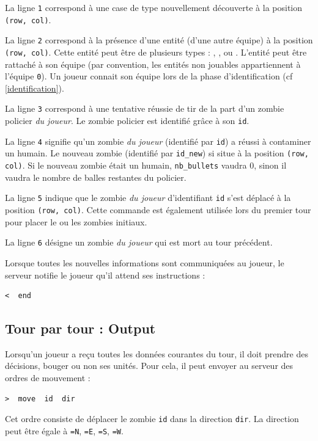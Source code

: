 La ligne \lstinline!1! correspond à une case de type \water{} nouvellement découverte à la position \lstinline!(row, col)!.

La ligne \lstinline!2! correspond à la présence d'une entité (d'une autre équipe) à la position \lstinline!(row, col)!.
Cette entité peut être de plusieurs types : \human{}, \cop{}, \zombie{} ou \berzerk{}.
L'entité peut être rattaché à son équipe (par convention, les entités non jouables appartiennent à l'équipe \lstinline!0!).
Un joueur connait son équipe lors de la phase d'identification (cf \ref{identification}).

La ligne \lstinline!3! correspond à une tentative réussie de tir de la part d'un zombie policier \emph{du joueur}.
Le zombie policier est identifié grâce à son \lstinline!id!.

La ligne \lstinline!4! signifie qu'un zombie \emph{du joueur} (identifié par \lstinline!id!) a réussi à contaminer un humain.
Le nouveau zombie (identifié par \lstinline!id_new!) si situe à la position \lstinline!(row, col)!.
Si le nouveau zombie était un humain, \lstinline!nb_bullets! vaudra 0, sinon il vaudra le nombre de balles restantes du policier.

La ligne \lstinline!5! indique que le zombie \emph{du joueur} d'identifiant \lstinline!id! s'est déplacé à la position \lstinline!(row, col)!.
Cette commande est également utilisée lors du premier tour pour placer le ou les zombies initiaux.

La ligne \lstinline!6! désigne un zombie \emph{du joueur} qui est mort au tour précédent.

Lorsque toutes les nouvelles informations sont communiquées au joueur, le serveur notifie le joueur qu'il attend ses instructions :
\begin{lstlisting}
<  end
\end{lstlisting}




\subsection{Tour par tour : Output} %
\label{output}
Lorsqu'un joueur a reçu toutes les données courantes du tour, il doit prendre des décisions, bouger ou non ses unités.
Pour cela, il peut envoyer au serveur des ordres de mouvement :
\begin{lstlisting}
>  move  id  dir
\end{lstlisting}
Cet ordre consiste de déplacer le zombie \lstinline!id! dans la direction \lstinline!dir!.
La direction peut être égale à \north{}\lstinline!=N!, \east{}\lstinline!=E!, \south{}\lstinline!=S!, \west{}\lstinline!=W!.

